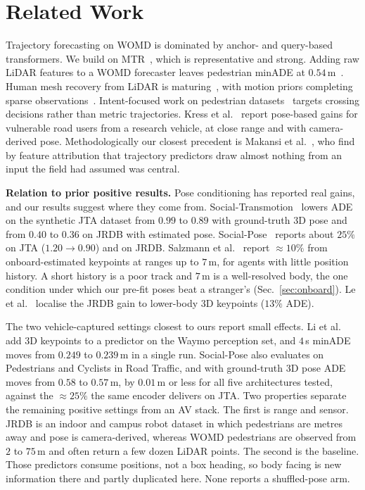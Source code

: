 \documentclass[conference]{IEEEtran}
\newcommand{\minADE}{minADE\xspace}
\begin{document}
\section{Related Work}
Trajectory forecasting on WOMD is dominated by anchor- and query-based
transformers. We build on MTR~\cite{shi2022mtr}, which is
representative and strong. Adding raw LiDAR features to a WOMD forecaster
leaves pedestrian \minADE at $0.54$\,m~\cite{chen2024womdlidar}. Human mesh recovery from LiDAR is
maturing~\cite{fan2023lidarhmr}, with motion priors completing sparse
observations~\cite{he2022nemf,mahmood2019amass}. Intent-focused
work on pedestrian datasets~\cite{rasouli2019pie,fang2018pedestrian} targets
crossing decisions rather than metric trajectories. Kress
et al.~\cite{kress2022pose} report pose-based gains for vulnerable road users
from a research vehicle, at close range and with camera-derived pose.
Methodologically our closest precedent is Makansi
et al.~\cite{makansi2022walkalone}, who find by feature attribution that
trajectory predictors draw almost nothing from an input the field had assumed
was central.

\textbf{Relation to prior positive results.} Pose conditioning has reported real
gains, and our results suggest where they come from. Social-Transmotion~\cite{saadatnejad2024socialtransmotion} lowers ADE on
the synthetic JTA dataset from $0.99$ to $0.89$ with ground-truth 3D pose
and from $0.40$ to $0.36$ on JRDB with estimated pose.
Social-Pose~\cite{gao2025socialpose} reports about $25\%$ on JTA
($1.20{\to}0.90$) and on JRDB. Salzmann et al.~\cite{salzmann2023robots} report
${\approx}10\%$ from onboard-estimated keypoints at ranges up to $7$\,m, for
agents with little position history. A short history is a poor track and $7$\,m
is a well-resolved body, the one condition under which our pre-fit poses
beat a stranger's (Sec.~\ref{sec:onboard}). Le et al.~\cite{le2026legsoverarms}
localise the JRDB gain to lower-body 3D keypoints ($13\%$ ADE).

The two vehicle-captured settings closest to ours report small effects.
Li et al.~\cite{li2023keypoints} add 3D keypoints to a predictor on the Waymo
perception set, and $4$\,s \minADE moves from $0.249$ to $0.239$\,m in a
single run.
Social-Pose also evaluates on Pedestrians and Cyclists in Road Traffic, and
with ground-truth 3D pose ADE moves
from $0.58$ to $0.57$\,m, by $0.01$\,m or less for all five architectures
tested, against the ${\approx}25\%$ the same encoder delivers on JTA. Two
properties separate the remaining positive settings from an AV stack.
The first is range and sensor. JRDB is an indoor and campus robot dataset in which
pedestrians are metres away and pose is camera-derived, whereas WOMD
pedestrians are observed from $2$ to $75$\,m and often return a few dozen LiDAR
points. The second is the baseline. Those predictors consume positions, not a box
heading, so body facing is new information there and partly duplicated here.
None reports a shuffled-pose arm.
\end{document}
